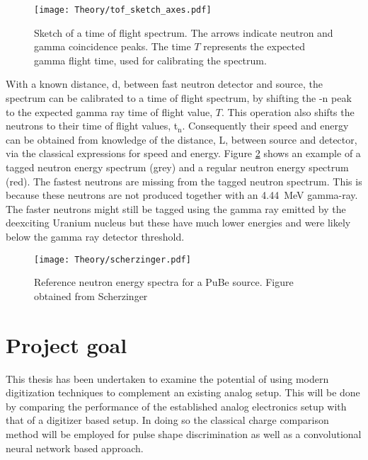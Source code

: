 \documentclass[main.tex]{subfiles}
\begin{document}
\begin{figure}[t]
    \centering
        \texttt{[image: Theory/tof\_sketch\_axes.pdf]}
        \caption[Sketch of a time of flight spectrum.]{Sketch of a time of flight spectrum. The arrows indicate neutron and gamma coincidence peaks. The time $T$ represents the expected gamma flight time, used for calibrating the spectrum.}
    \label{fig:tof_sketch} 
\end{figure}

With a known distance, d, between fast neutron detector and source, the spectrum can be calibrated to a time of flight spectrum, by shifting the \textgamma-n peak to the expected gamma ray time of flight value, $T$. This operation also shifts the neutrons to their time of flight values, t$_\text{n}$. Consequently their speed and energy can be obtained from knowledge of the distance, L, between source and detector, via the classical expressions for speed and energy. Figure \ref{fig:scherzinger} shows an example of a tagged neutron energy spectrum (grey) and a regular neutron energy spectrum (red). The fastest neutrons are missing from the tagged neutron spectrum. This is because these neutrons are not produced together with an \SI{4.44}{\MeV} gamma-ray. The faster neutrons might still be tagged using the gamma ray emitted by the deexciting Uranium nucleus but these have much lower energies and were likely below the gamma ray detector threshold.
\begin{figure}[t]
    \centering
        \texttt{[image: Theory/scherzinger.pdf]}
        \caption[Reference neutron energy spectrum]{Reference neutron energy spectra for a PuBe source. Figure obtained from Scherzinger\cite{ScherzingerPhd}}
    \label{fig:scherzinger} 
\end{figure}

\section{Project goal}
This thesis has been undertaken to examine the potential of using modern digitization techniques to complement an existing analog setup. This will be done by comparing the performance of the established analog electronics setup with that of a digitizer based setup. In doing so the classical charge comparison method will be employed for pulse shape discrimination as well as a convolutional neural network based approach.
\end{document}
